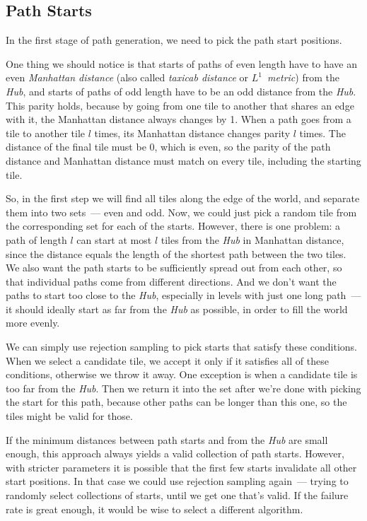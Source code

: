 \subsection{Path Starts}

In the first stage of path generation, we need to pick the path start positions.

One thing we should notice is that starts of paths of even length have to have an even \emph{Manhattan distance} (also called \emph{taxicab distance} or \emph{$L^1$~metric}) from the \emph{Hub}, and starts of paths of odd length have to be an odd distance from the \emph{Hub}.
This parity holds, because by going from one tile to another that shares an edge with it, the Manhattan distance always changes by 1.
When a path goes from a tile to another tile $l$ times, its Manhattan distance changes parity $l$ times.
The distance of the final tile must be 0, which is even, so the parity of the path distance and Manhattan distance must match on every tile, including the starting tile.

So, in the first step we will find all tiles along the edge of the world, and separate them into two sets~--- even and odd.
Now, we could just pick a random tile from the corresponding set for each of the starts.
However, there is one problem: a path of length $l$ can start at most $l$ tiles from the \emph{Hub} in Manhattan distance, since the distance equals the length of the shortest path between the two tiles.
We also want the path starts to be sufficiently spread out from each other, so that individual paths come from different directions.
And we don't want the paths to start too close to the \emph{Hub}, especially in levels with just one long path~--- it should ideally start as far from the \emph{Hub} as possible, in order to fill the world more evenly.

We can simply use rejection sampling to pick starts that satisfy these conditions.
When we select a candidate tile, we accept it only if it satisfies all of these conditions, otherwise we throw it away.
One exception is when a candidate tile is too far from the \emph{Hub}.
Then we return it into the set after we're done with picking the start for this path, because other paths can be longer than this one, so the tiles might be valid for those.

If the minimum distances between path starts and from the \emph{Hub} are small enough, this approach always yields a valid collection of path starts.
However, with stricter parameters it is possible that the first few starts invalidate all other start positions.
In that case we could use rejection sampling again~--- trying to randomly select collections of starts, until we get one that's valid.
If the failure rate is great enough, it would be wise to select a different algorithm.


